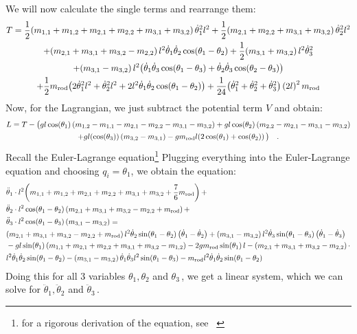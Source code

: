 \documentclass[11pt,a4paper, oneside,titlepage]{report}
\newcommand{\br}[1]{\mathopen{} \left( #1 \right)}
\begin{document}
We will now calculate the single terms and rearrange them:
\begin{multline*}
T = \frac{1}{2} \br{m_{1,1} + m_{1,2}+ m_{2,1} + m_{2,2} + m_{3,1} + m_{3,2}} \dot{\theta}_1^2 l^2 + \frac{1}{2} \br{m_{2,1} + m_{2,2} + m_{3,1} + m_{3,2}} \dot{\theta}_2^2 l^2 \\
+ \br{m_{2,1} + m_{3,1} + m_{3,2} - m_{2,2}} l^2 \dot{\theta}_1 \dot{\theta}_2 \cos \br{\theta_1 - \theta_2} + \frac{1}{2} \br{m_{3,1} + m_{3,2}} l^2\dot{\theta}_3^2 \\
+ \br{m_{3,1} - m_{3,2}} l^2\br{\dot{\theta}_1 \dot{\theta}_3 \cos \br{\theta_1 - \theta_3} + \dot{\theta}_2 \dot{\theta}_3 \cos \br{\theta_2 - \theta_3}} \\
+ \frac{1}{2} m_{\textup{rod}} \br{2\dot{\theta}_1^2l^2+\dot{\theta}_2^2l^2 + 2l^2\dot{\theta}_1\dot{\theta}_2 \cos \br{\theta_1-\theta_2}}+ \frac{1}{24}\br{\dot{\theta}_1^2 +  \dot{\theta}_2^2 + \dot{\theta}_3^2} \br{2l}^2 m_{\textup{rod}}
\end{multline*}
Now, for the Lagrangian, we just subtract the potential term $V$ and obtain:
\begin{multline*}
L = T - \big(gl \cos\br{\theta_1} \br{m_{1,2} - m_{1,1} - m_{2,1} - m_{2,2} - m_{3,1} - m_{3,2}} + gl \cos \br{\theta_2} \br{m_{2,2} - m_{2,1} - m_{3,1} - m_{3,2}} \\+ gl \br{\cos \br{\theta_3}} \br{m_{3,2} - m_{3,1}} - gm_{\textup{rod}} l \br{2\cos \br{\theta_1} + \cos \br{\theta_2}} \big) \quad .
\end{multline*}
Recall the Euler-Lagrange equation\footnote{for a rigorous derivation of the equation, see ~\cite{skript}}
Plugging everything into the Euler-Lagrange equation and choosing $q_i = \theta_1$, we obtain the equation:
\begin{align*}
&\ddot{\theta}_1 \cdot l^2 \br{m_{1,1} + m_{1,2} +m_{2,1} +m_{2,2} +m_{3,1} +m_{3,2}+ \frac{7}{6}m_{\textup{rod}}} + \\
&\ddot{\theta}_2 \cdot l^2 \cos \br{\theta_1-\theta_2} \br{m_{2,1} +m_{3,1} +m_{3,2} -m_{2,2} + m_{\textup{rod}}} +\\
&\ddot{\theta}_3 \cdot l^2 \cos \br{\theta_1 - \theta_3} \br{m_{3,1} - m_{3,2}} = \\
&\br{m_{2,1} + m_{3,1} + m_{3,2} - m_{2,2} +m_{\textup{rod}}} l^2 \dot{\theta}_2 \sin \br{\theta_1 - \theta_2} \br{\dot{\theta}_1 - \dot{\theta}_2} +\br{m_{3,1} - m_{3,2}} l^2 \dot{\theta}_3 \sin\br{\theta_1-\theta_3} \br{\dot{\theta}_1 - \dot{\theta}_3}  \\
&- gl \sin \br{\theta_1}\br{m_{1,1} + m_{2,1} + m_{2,2} + m_{3,1} + m_{3,2} - m_{1,2}} - 2 g m_{\textup{rod}}\sin\br{\theta_1} l 
- \br{m_{2,1} + m_{3,1} + m_{3,2} - m_{2,2}} \cdot\\ &l^2 \dot{\theta}_1 \dot{\theta}_2 \sin\br{\theta_1 - \theta_2}- \br{m_{3,1} - m_{3,2}} \dot{\theta}_1 \dot{\theta}_3 l^2 \sin\br{\theta_1 - \theta_3} - m_{\textup{rod}} l^2 \dot{\theta}_1 \dot{\theta}_2 \sin\br{\theta_1 - \theta_2}
\end{align*}
Doing this for all 3 variables $\theta_1, \theta_2$ and $\theta_3\,$, we get a linear system, which we can solve for $\ddot{\theta}_1, \ddot{\theta}_2$ and $\ddot{\theta}_3\,$.






\end{document}
